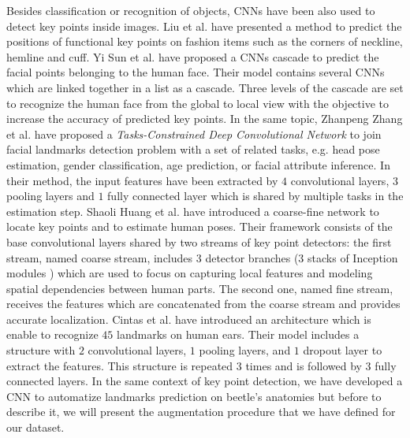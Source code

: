 \documentclass[review]{elsarticle}
\begin{document}
Besides classification or recognition of objects, CNNs have been also used to detect key points inside images. Liu et al. \cite{liu2016fashion} have presented a method to predict the positions of functional key points on fashion items such as the corners of neckline, hemline and cuff. Yi Sun et al. \cite{sun2013deep} have proposed a CNNs cascade to predict the facial points belonging to the human face. 
Their model contains several CNNs which are linked together in a list as a cascade. Three levels of the cascade are set to recognize the human face from the global to local view with the objective to increase the accuracy of predicted key points. In the same topic, Zhanpeng Zhang et al. \cite{zhang2014facial} have proposed a \textit{Tasks-Constrained Deep Convolutional Network} to join facial landmarks detection problem with a set of related tasks, e.g. head pose estimation, gender classification, age prediction, or facial attribute inference. In their method, the input features have been extracted by $4$ convolutional layers, $3$ pooling layers and $1$ fully connected layer which is shared by  multiple tasks in the estimation step. Shaoli Huang et al. \cite{huang2017coarse} have introduced a coarse-fine network to locate key points and to estimate human poses. Their framework consists of the base convolutional layers shared by two streams of key point detectors: the first stream, named coarse stream, includes $3$ detector branches (3 stacks of Inception modules \cite{szegedy2015going}) which are used to focus on capturing local features and modeling spatial dependencies between human parts. The second one, named fine stream, receives the  features which are concatenated from the coarse stream and provides accurate localization. Cintas et al. \cite{cintas2016automatic} have introduced an architecture which is enable to recognize $45$ landmarks on human ears. Their model includes a structure with $2$ convolutional layers, $1$ pooling layers, and $1$ dropout layer to extract the features. This structure is repeated $3$ times and is followed by 3 fully connected layers. In the same context of key point detection, we have developed a CNN to automatize landmarks prediction on beetle's anatomies but before to describe it, we will present the augmentation procedure that we have defined for our dataset.


\end{document}
